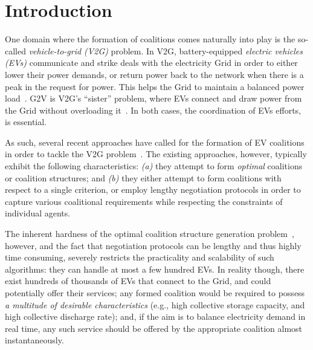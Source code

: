 
\chapter{Introduction} %

\label{Chapter1} %


One domain where the formation of coalitions comes naturally into play is the so-called {\em vehicle-to-grid (V2G)} problem. In V2G, battery-equipped {\em electric vehicles (EVs)} communicate and strike deals with the electricity Grid in order to either lower their power demands, or return power back to the network when there is a peak in the request for power. This helps the Grid to maintain 
a balanced power load~\cite{ramchurn2012putting}. 
G2V is V2G's ``sister'' problem, where EVs connect and draw power from the Grid without overloading it~\cite{valogianni2014effective}. 
In both cases, the coordination of EVs efforts, is essential.

As such, several recent approaches have called for the formation of EV coalitions in order to tackle the V2G problem~\cite{deORamos2014,kamboj2010exploring,kamboj2011deploying}.
The existing approaches, however, typically exhibit the following characteristics: {\em (a)} they attempt to form {\em optimal} coalitions or coalition structures; and {\em (b)} they either attempt to form coalitions with respect to a single criterion, or employ lengthy negotiation protocols in order to capture various coalitional requirements while respecting the constraints of individual agents. 

The inherent hardness of the optimal coalition structure generation problem~\cite{rahwan2009anytime}, however, and the fact that negotiation protocols can be lengthy and thus highly time consuming, severely restricts the practicality and scalability of such algorithms: they can handle at most a few hundred EVs. In reality though, there exist hundreds of thousands of EVs that connect to the Grid, and could potentially offer their services; any formed coalition would be required to possess {\em a multitude of desirable characteristics} (e.g., high collective storage capacity, and high collective discharge rate); and, if the aim is to balance electricity demand in real time, any such service should be offered by the appropriate coalition almost instantaneously.

